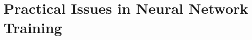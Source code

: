 \renewcommand{\prevpart}{4 }
\renewcommand{\thispart}{5 }
\renewcommand{\nextpart}{6 }

\section{Practical Issues in Neural Network Training}




